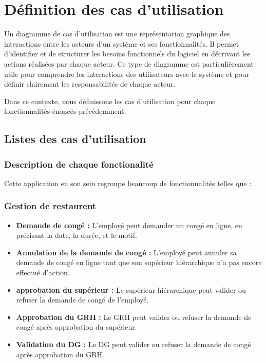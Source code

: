 \section{D\'efinition des cas d'utilisation}

Un diagramme de cas d'utilisation est une représentation graphique des interactions entre les acteurs d'un système et ses fonctionnalités. Il permet d'identifier et de structurer les besoins fonctionnels du logiciel en décrivant les actions réalisées par chaque acteur. Ce type de diagramme est particulièrement utile pour comprendre les interactions des utilisateurs avec le système et pour définir clairement les responsabilités de chaque acteur.

Dans ce contexte, nous définissons les cas d'utilisation pour chaque fonctionnalités énoncés précédemment.
\subsection{Listes des cas d'utilisation}
\subsubsection{Description de chaque fonctionalité}
Cette application en son sein regroupe beaucoup de fonctionnalités telles que :
\subsubsection{Gestion de restaurent}
\begin{itemize}
    \item \textbf{Demande de congé :} L'employé peut demander un congé en ligne, en précisant la date, la durée, et le motif.
    \item \textbf{Annulation de la demande de congé :} L'employé peut annuler sa demande de congé en ligne tant que son supérieur hiérarchique n'a pas encore effectué d'action.
    \item \textbf{approbation du supérieur :} Le supérieur hiérarchique peut valider ou refuser la demande de congé de l'employé.
    \item \textbf{Approbation du GRH :} Le GRH peut valider ou refuser la demande de congé après approbation du supérieur.
    \item \textbf{Validation du DG :} Le DG peut valider ou refuser la demande de congé après approbation du GRH.
\end{itemize}



